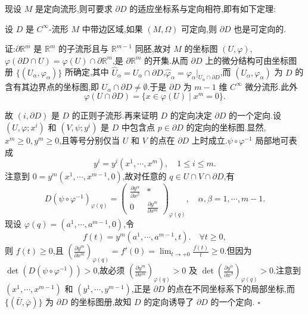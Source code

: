 现设 $M$ 是定向流形,则可要求 $\partial D$ 的适应坐标系与定向相符,即有如下定理:

\begin{theorem}
设 $D$ 是 $C^\infty$-流形 $M$ 中带边区域,如果 $(M, \Omega)$ 可定向,则 $\partial D$ 也是可定向的.
\end{theorem}

证:$\partial \mathbb{R}^m$ 是 $\mathbb{R}^m$ 的子流形且与 $\mathbb{R}^{m-1}$ 同胚,故对 $M$ 的坐标图 $(U, \varphi)$,$\varphi(\partial D \cap U) = \varphi(U) \cap \partial \mathbb{R}^m$,是 $\partial \mathbb{R}^m$ 的开集.从而 $\partial D$ 上的微分结构可由坐标图册 $\{(U_\alpha, \varphi_\alpha)\}$ 所确定,其中 $\hat{U}_\alpha = U_\alpha \cap \partial D$,$\hat{\varphi}_\alpha = \varphi_\alpha |_{U_\alpha \cap \partial D}$,而 $(U_\alpha, \varphi_\alpha)$ 为 $D$ 的含有其边界点的坐标图,即 $U_\alpha \cap \partial D \neq \emptyset$.于是 $\partial D$ 为 $m-1$ 维 $C^\infty$ 微分流形.此外
\[
\varphi(U \cap \partial D) = \{x \in \varphi(U) \mid x^m = 0\}.
\]

故 $(i, \partial D)$ 是 $D$ 的正则子流形.再来证明 $D$ 的定向决定 $\partial D$ 的一个定向.设 $(U, \varphi; x^i)$ 和 $(V, \psi; y^i)$ 是 $D$ 中包含点 $p \in \partial D$ 的定向的坐标图.显然,$x^m \geq 0, y^m \geq 0$,且等号分别仅当 $U$ 和 $V$ 的点在 $\partial D$ 上时成立.$\psi \circ \varphi^{-1}$ 局部地可表成
\[
y^i = y^i \left( x^1, \cdots, x^m \right), \quad 1 \leq i \leq m.
\]
注意到 $0 = y^{m} \left( x^1, \cdots, x^{m-1}, 0 \right)$,故对任意的 $q \in U \cap V \cap \partial D$,有
\[
D \left( \psi \circ \varphi^{-1} \right)_{\varphi(q)} = \begin{pmatrix}
\frac{\partial y^\alpha}{\partial x^\beta} & * \\
0 & \frac{\partial y^m}{\partial x^m} 
\end{pmatrix}_{\varphi(q)}, \quad \alpha, \beta = 1, \cdots, m - 1.
\]
现设 $\varphi(q) = (a^1, \cdots, a^{m-1}, 0)$,令
\[
f(t) = y^m \left( a^1, \cdots, a^{m-1}, t \right). \quad \forall t \geq 0,
\]
则 $f(t) \geq 0$,且 $\left( \frac{\partial y^m}{\partial x^m} \right)_{\varphi(q)} = f'(0) = \lim_{t \to +0} \frac{f(t)}{t} \geq 0$.但因为 $\det \left( D \left( \psi \circ \varphi^{-1} \right) \right) > 0$,故必须 $\left( \frac{\partial y^m}{\partial x^m} \right)_{\varphi(q)} > 0$ 及 $\det \left( \frac{\partial y^\alpha}{\partial x^\beta} \right)_{\varphi(q)} > 0$.注意到 $(x^1, \cdots, x^{m-1})$ 和 $(y^1, \cdots, y^{m-1})$,正是 $\partial D$ 的点在不同坐标系下的局部坐标,而 $\{ (\bar{U}, \bar{\varphi}) \}$ 为 $\partial D$ 的坐标图册,故知 $D$ 的定向诱导了 $\partial D$ 的一个定向. $\square$

